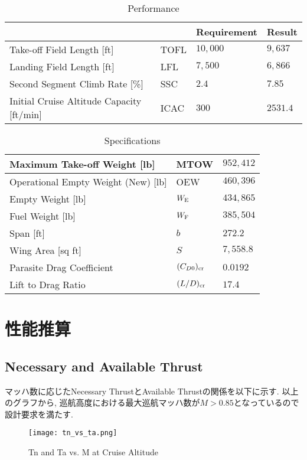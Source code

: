 \documentclass[12pt]{jsarticle}
\begin{document}
\begin{table}[H]
	\caption{Performance}
	\begin{center}
		\begin{tabular}{p{7cm} p{1cm} p{2cm} p{2cm}} \hline
			  & & Requirement & Result \\ \hline \hline
			 Take-off Field Length [ft] & TOFL & $10,000$ & $9,637$ \\ \hline
			 Landing Field Length [ft] & LFL & $7,500$ & $6,866$ \\ \hline
			 Second Segment Climb Rate [\%] & SSC & $2.4$ & $7.85$ \\ \hline
			 Initial Cruise Altitude Capacity [ft/min] & ICAC & $300$ & $2531.4$ \\ \hline
		\end{tabular}
	\end{center}
\end{table}

\begin{table}[H]
	\caption{Specifications}
	\begin{center}
		\begin{tabular}{p{6cm} p{1cm} p{2cm}} \hline
			 Maximum Take-off Weight [lb] & MTOW & $952,412$ \\ \hline
			 Operational Empty Weight (New) [lb] & OEW & $460,396$ \\ \hline
			 Empty Weight [lb] & $W_{\rm E}$ & $434,865$ \\ \hline
			 Fuel Weight [lb] & $W_{\rm F}$ & $385,504$ \\ \hline
			 Span [ft] & $b$ & $272.2$ \\ \hline
			 Wing Area [sq ft] & $S$ & $7,558.8$ \\ \hline
			 Parasite Drag Coefficient & $(C_{D0})_{\rm cr}$ & $0.0192$ \\ \hline
			 Lift to Drag Ratio & $(L/D)_{\rm cr}$ & $17.4$ \\ \hline
		\end{tabular}
	\end{center}
\end{table}

\section{性能推算}
\subsection{Necessary and Available Thrust}
マッハ数に応じたNecessary ThrustとAvailable Thrustの関係を以下に示す.
以上のグラフから, 巡航高度における最大巡航マッハ数が$M > 0.85$となっているので設計要求を満たす.
\begin{figure}[H]
\begin{center}
\texttt{[image: tn\_vs\_ta.png]}
\caption{Tn and Ta vs. M at Cruise Altitude}
\end{center}
\end{figure}
\end{document}
